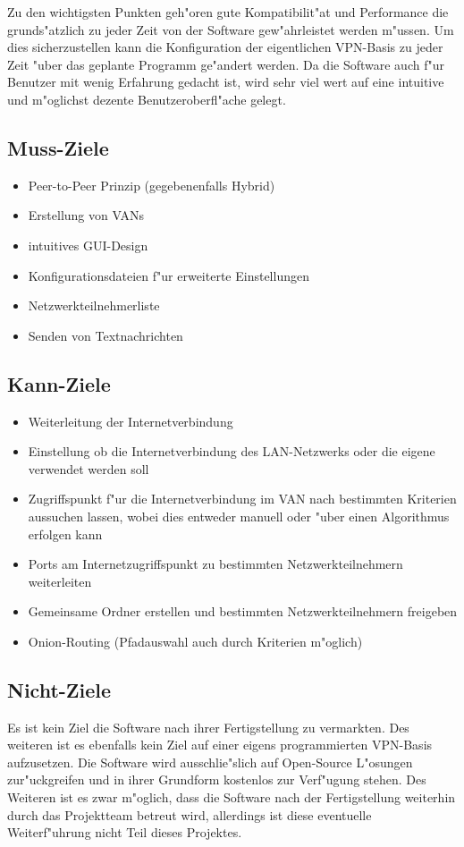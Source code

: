 \documentclass[a4paper,12pt]{scrreprt}
\begin{document}
		Zu den wichtigsten Punkten geh"oren gute Kompatibilit"at und Performance die grunds"atzlich zu jeder Zeit von der Software gew"ahrleistet werden m"ussen. Um dies sicherzustellen kann die Konfiguration der eigentlichen VPN-Basis zu jeder Zeit "uber das geplante Programm ge"andert werden. Da die Software auch f"ur Benutzer mit wenig Erfahrung gedacht ist, wird sehr viel wert auf eine intuitive und m"oglichst dezente Benutzeroberfl"ache gelegt.
		
			
		\subsection{Muss-Ziele}
		\begin{itemize}
		\item Peer-to-Peer Prinzip (gegebenenfalls Hybrid)
		\item Erstellung von VANs
		\item intuitives GUI-Design
		\item Konfigurationsdateien f"ur erweiterte Einstellungen
		\item Netzwerkteilnehmerliste
		\item Senden von Textnachrichten
		\end{itemize}
		
			
		\subsection{Kann-Ziele}
			\begin{itemize}
			\item Weiterleitung der Internetverbindung
			\item Einstellung ob die Internetverbindung des LAN-Netzwerks oder die eigene verwendet werden soll
			\item Zugriffspunkt f"ur die Internetverbindung im VAN nach bestimmten Kriterien aussuchen lassen, wobei dies entweder manuell oder "uber einen Algorithmus erfolgen kann
			
			\item Ports am Internetzugriffspunkt zu bestimmten Netzwerkteilnehmern weiterleiten
			\item Gemeinsame Ordner erstellen und bestimmten Netzwerkteilnehmern freigeben
			
			\item Onion-Routing (Pfadauswahl auch durch Kriterien m"oglich)
			
			\end{itemize}
			
		\subsection{Nicht-Ziele}
			Es ist kein Ziel die Software nach ihrer Fertigstellung zu vermarkten. Des weiteren ist es ebenfalls kein Ziel auf einer eigens programmierten VPN-Basis aufzusetzen. Die Software wird ausschlie"slich auf Open-Source L"osungen zur"uckgreifen und in ihrer Grundform kostenlos zur Verf"ugung stehen. Des Weiteren ist es zwar m"oglich, dass die Software nach der Fertigstellung weiterhin durch das Projektteam betreut wird, allerdings ist diese eventuelle Weiterf"uhrung nicht Teil dieses Projektes.
			
\end{document}
